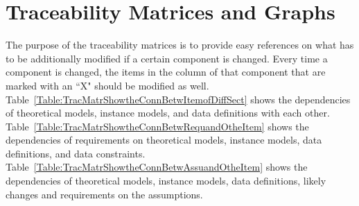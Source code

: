 \documentclass[12pt]{article}
\begin{document}
\section{Traceability Matrices and Graphs}
\label{Sec:TracMatrandGrap}
The purpose of the traceability matrices is to provide easy references on what has to be additionally modified if a certain component is changed. Every time a component is changed, the items in the column of that component that are marked with an ``X" should be modified as well. Table~\ref{Table:TracMatrShowtheConnBetwItemofDiffSect} shows the dependencies of theoretical models, instance models, and data definitions with each other. Table~\ref{Table:TracMatrShowtheConnBetwRequandOtheItem} shows the dependencies of requirements on theoretical models, instance models, data definitions, and data constraints. Table~\ref{Table:TracMatrShowtheConnBetwAssuandOtheItem} shows the dependencies of theoretical models, instance models, data definitions, likely changes and requirements on the assumptions.
\end{document}

